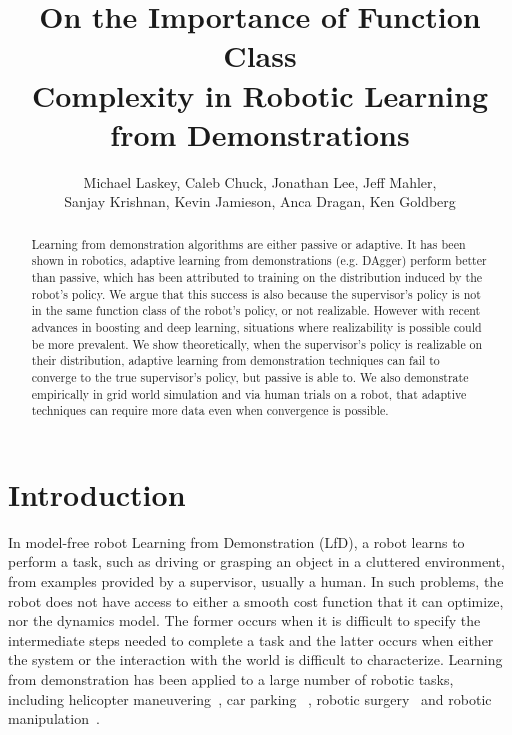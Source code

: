 \documentclass[10pt, conference]{ieeeconf}      %
\title{On the Importance of Function Class \\
Complexity in Robotic Learning from Demonstrations}
\author{Michael Laskey, Caleb Chuck, Jonathan Lee, Jeff Mahler,\\ Sanjay Krishnan, Kevin Jamieson, Anca Dragan, Ken Goldberg}
\begin{document}
\maketitle
\thispagestyle{empty}
\pagestyle{empty}







\begin{abstract}
Learning from demonstration algorithms are either passive or adaptive. It has been shown in robotics, adaptive learning from demonstrations (e.g. DAgger) perform better than passive, which has been attributed to training on the distribution induced by the robot's policy. We argue that this success is also because the supervisor's policy  is not in the same function class of the robot's policy, or not realizable. However with recent advances in boosting and deep learning, situations where realizability is possible could be more prevalent.  We show theoretically, when the supervisor's policy is realizable on their distribution, adaptive learning from demonstration techniques can fail to converge to the true supervisor's policy, but passive is able to. We also demonstrate empirically in grid world simulation and via human trials on a robot, that adaptive techniques can require more data even when convergence is possible.
 \end{abstract}


\section{Introduction} 
In model-free robot Learning from Demonstration (LfD), a robot learns to perform a task, such as driving or grasping an object in a cluttered environment, from examples provided by a  supervisor, usually a human. In such problems, the robot does not have access to either a smooth cost function that it can optimize, nor the dynamics model. The former occurs when it is difficult to specify the intermediate steps needed to complete a task and the latter occurs when either the system or the interaction with the world is difficult to characterize. Learning from demonstration has been applied to a large number of robotic tasks, including helicopter maneuvering~\cite{abbeel2007application}, car parking~\cite{abbeel2008apprenticeship} , robotic surgery~\cite{van2010superhuman,laskeyshiv} and robotic manipulation~\cite{laskeyrobot}.
\end{document}

